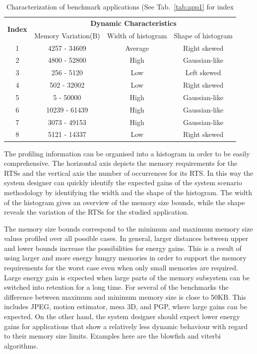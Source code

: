 \documentclass[smallcondensed]{svjour3}
\begin{document}
\begin{table}
\caption{Characterization of benchmark applications (See Tab.~\ref{tab:app1} for index}
\label{tab:app2}
{
\begin{tabular}{|c|c|c|c|}
\hline
\multirow{2}{*}{\textbf{Index}} & \multicolumn{3}{c|}{\textbf{Dynamic Characteristics}} \\ \cline{2-4}
 & Memory Variation(B) & Width of histogram & Shape of histogram\\ 
\hline 
1 & 4257 - 34609 & Average & Right skewed \\ 
\hline 
2 & 4800 - 52800 & High & Gaussian-like \\ 
\hline 
3 & 256 - 5120 & Low  & Left skewed \\ 
\hline 
4 & 502 - 32002 & Low  & Right skewed \\ 
\hline 
5 & 5 - 50000 & High  & Gaussian-like\\ 
\hline 
6 & 10239 - 61439 & High & Gaussian-like \\ 
\hline 
7 & 3073 - 49153 & High  & Gaussian-like \\ 
\hline 
8 & 5121 - 14337 & Low & Right skewed \\ 
\hline 
\end{tabular}}
\end{table}

The profiling information can be organised into a histogram in order to be easily comprehensive. 
The horizontal axis depicts the memory requirements for the RTSs and the vertical axis the number of occurrences for its RTS. 
In this way the system designer can quickly identify the expected gains of the system scenario methodology by identifying the width and the shape of the histogram. 
The width of the histogram gives an overview of the memory size bounds, while the shape reveals the variation of the RTSs for the studied application.

The memory size bounds correspond to the minimum and maximum memory size values profiled over all possible cases. 
In general, larger distances between upper and lower bounds increase the possibilities for energy gains. 
This is a result of using larger and more energy hungry memories in order to support the memory requirements for the worst case even when only small memories are required. 
Large energy gain is expected when large parts of the memory subsystem can be switched into retention for a long time. 
For several of the benchmarks the difference between maximum and minimum memory size is close to 50KB. 
This includes JPEG, motion estimator, mesa 3D, and PGP, where large gains can be expected. 
On the other hand, the system designer should expect lower energy gains for applications that show a relatively less dynamic behaviour with regard to their memory size limits. 
Examples here are the blowfish and viterbi algorithms. 
\end{document}
